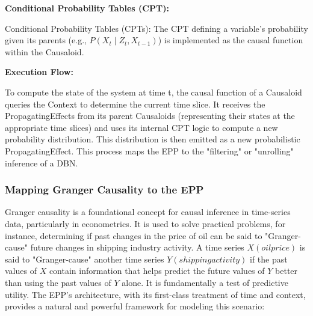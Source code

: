 \textbf{Conditional Probability Tables (CPT):}

Conditional Probability Tables (CPTs): The CPT defining a variable's probability given its parents
(e.g., $P(X_t \mid Z_t, X_{t-1})$) is implemented as the causal function within the Causaloid.


\textbf{Execution Flow:}

To compute the state of the system at time t, the causal function of a Causaloid queries the Context to determine the current time slice. It receives the PropagatingEffects from its parent Causaloids (representing their states at the appropriate time slices) and uses its internal CPT logic to compute a new probability distribution. This distribution is then emitted as a new probabilistic PropagatingEffect. This process maps the EPP to the "filtering" or "unrolling" inference of a DBN.
%
%
\subsubsection{Mapping Granger Causality to the EPP}
\label{sec:epp_Granger_Causality}

Granger causality is a foundational concept for causal inference in time-series data, particularly in econometrics. It is used to solve practical problems, for instance, determining if past changes in the price of oil can be said to "Granger-cause" future changes in shipping industry activity. 
A time series $X(oil price)$ is said to "Granger-cause" another time series $Y(shipping activity)$ if the past values of  $X$ contain information that helps predict the future values of $Y$ 
 better than using the past values of $Y$ alone. It is fundamentally a test of predictive utility. The EPP's architecture, with its first-class treatment of time and context, provides a natural and powerful framework for modeling this scenario:

